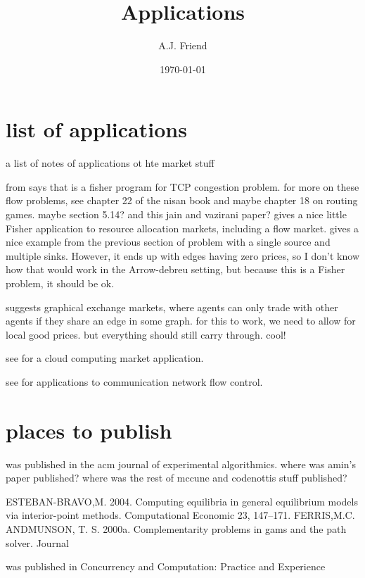 \documentclass[12pt]{article}
\title{Applications}
\author{A.J. Friend}
\date{\today}
\begin{document}
\maketitle

\section{list of applications}
a list of notes of applications ot hte market stuff

from \cite[p.~104]{nisan2007algorithmic} says that \cite{kelly1997charging}
is a fisher program for TCP congestion problem. for more on these flow problems,
see chapter 22 of the nisan book and maybe chapter 18 on routing games. maybe
section 5.14? and this jain and vazirani paper?
\cite[\S5.13]{nisan2007algorithmic} gives a nice little Fisher application
to resource allocation markets, including a flow market.
\cite[\S5.14]{nisan2007algorithmic} gives a nice example from the previous
section of problem with a single
source and multiple sinks. However, it ends up with edges having zero prices,
so I don't know how that would work in the Arrow-debreu setting, but because
this is a Fisher problem, it should be ok.

\cite[\S7.5]{nisan2007algorithmic} suggests graphical exchange markets, where
agents can only trade with other agents if they share an edge in some graph.
for this to work, we need to allow for local good prices. but everything should
still carry through. cool!

see \cite{gomes2012pure} for a cloud computing market application.


see \cite{srikant2004mathematics,
kelly1997charging,
kelly1998rate,
low1999optimization,
yaiche2000game} for applications to communication network flow control.

\section{places to publish}
\cite{codenotti2008experimental} was published in the acm journal of experimental algorithmics.
where was amin's paper published?
where was the rest of mccune and codenottis stuff published?

ESTEBAN-BRAVO,M. 2004. Computing equilibria in general equilibrium models via interior-point methods. Computational Economic 23, 147–171.
FERRIS,M.C. ANDMUNSON, T. S. 2000a. Complementarity problems in gams and the path solver. Journal

\cite{gomes2012pure} was published in Concurrency and Computation: Practice and Experience



\end{document}
